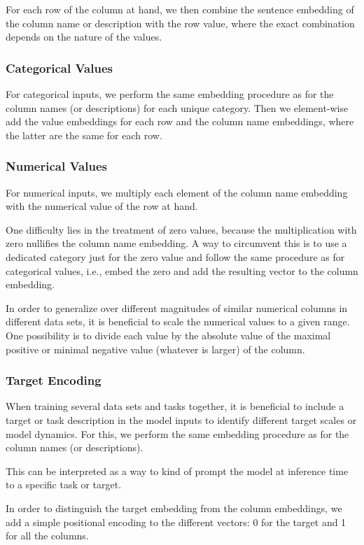 \documentclass{article}
\begin{document}
For each row of the column at hand, we then combine the sentence embedding of the column name or description with the row value, where the exact combination depends on the nature of the values.

\subsubsection{Categorical Values}
\label{sec:categorical}
For categorical inputs, we perform the same embedding procedure as for the column names (or descriptions) for each unique category. Then we element-wise add the value embeddings for each row and the column name embeddings, where the latter are the same for each row.

\subsubsection{Numerical Values}
\label{sec:numerical}
For numerical inputs, we multiply each element of the column name embedding with the numerical value of the row at hand.

One difficulty lies in the treatment of zero values, because the multiplication with zero nullifies the column name embedding. A way to circumvent this is to use a dedicated category just for the zero value and follow the same procedure as for categorical values, i.e., embed the zero and add the resulting vector to the column embedding.

In order to generalize over different magnitudes of similar numerical columns in different data sets, it is beneficial to scale the numerical values to a given range. One possibility is to divide each value by the absolute value of the maximal positive or minimal negative value (whatever is larger) of the column.

\subsubsection{Target Encoding}
When training several data sets and tasks together, it is beneficial to include a target or task description in the model inputs to identify different target scales or model dynamics. For this, we perform the same embedding procedure as for the column names (or descriptions).

This can be interpreted as a way to kind of prompt the model at inference time to a specific task or target.

In order to distinguish the target embedding from the column embeddings, we add a simple positional encoding to the different vectors: 0 for the target and 1 for all the columns.
\end{document}
